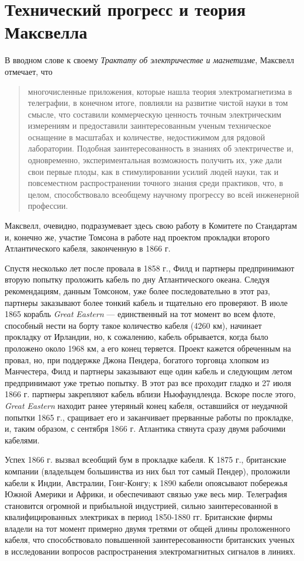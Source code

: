 \documentclass[12pt, oneside, a4paper]{article}
\begin{document}
\section*{Технический прогресс и теория Максвелла}
В вводном слове к своему \emph{Трактату об электричестве и магнетизме}, Максвелл отмечает, что 
\begin{quote}
\small
многочисленные приложения, которые нашла теория электромагнетизма в телеграфии, в конечном итоге, повлияли на развитие чистой науки в том смысле, что составили коммерческую ценность точным электрическим измерениям и предоставили заинтересованным ученым техническое оснащение в масштабах и количестве, недостижимом для рядовой лаборатории. Подобная заинтересованность в знаниях об электричестве и, одновременно, экспериментальная возможность получить их, уже дали свои первые плоды, как в стимулировании усилий людей науки, так и повсеместном распространении точного знания среди практиков, что, в целом, способствовало  всеобщему научному прогрессу во всей инженерной профессии.
\end{quote}
Максвелл, очевидно, подразумевает здесь свою работу в Комитете по Стандартам и, конечно же, участие Томсона в работе над проектом прокладки второго Атлантического кабеля, законченную в 1866 г.

Спустя несколько лет после провала в 1858 г., Филд и партнеры предпринимают вторую попытку проложить кабель по дну Атлантического океана. Следуя рекомендациям, данным Томсоном, уже более последовательно в этот раз, партнеры заказывают более тонкий кабель и тщательно его проверяют. В июле 1865 корабль \emph{Great Eastern} --- единственный на тот момент во всем флоте, способный нести на борту такое количество кабеля (4260 км), начинает прокладку от Ирландии, но, к сожалению, кабель обрывается, когда было проложено около 1968 км, а его конец теряется. Проект кажется обреченным на провал, но, при поддержке Джона Пендера, богатого торговца хлопком из Манчестера, Филд и партнеры заказывают еще один кабель и следующим летом предпринимают уже третью попытку. В этот раз все проходит гладко и 27 июля 1866 г. партнеры закрепляют кабель вблизи Ньюфаундленда. Вскоре после этого, \emph{Great Eastern} находит ранее утеряный конец кабеля, оставшийся от неудачной попытки 1865 г., сращивает его и заканчивает прерванные работы по прокладке, и, таким образом, с сентября 1866 г. Атлантика стянута сразу двумя рабочими кабелями.

Успех 1866 г. вызвал всеобщий бум в прокладке кабеля. К 1875 г., британские компании (владельцем большинства из них был тот самый Пендер), проложили кабели к Индии, Австралии, Гонг-Конгу; к 1890 кабели опоясывают побережья Южной Америки и Африки, и обеспечивают связью уже весь мир. Телеграфия становится огромной и прибыльной индустрией, сильно заинтересованной в квалифицированных электриках в период 1850-1880 гг. Британские фирмы владели на тот момент примерно двумя третями от общей длины проложенного кабеля, что способствовало повышенной заинтересованности британских ученых в исследовании вопросов распространения электромагнитных сигналов в линиях.
\end{document}
